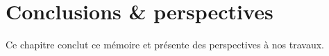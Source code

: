 \chapter{Conclusions \& perspectives}
\label{chapter:conclusions}

\mminitoc

Ce chapitre conclut ce mémoire et présente des perspectives à nos travaux.

